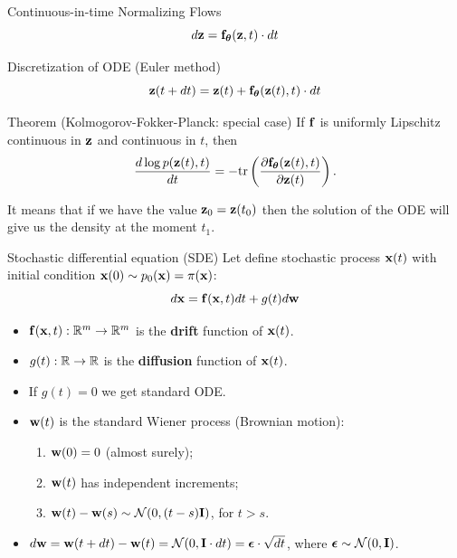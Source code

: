 \begin{frame}{Continuous-in-time Normalizing Flows}
	\[
 			d \mathbf{z} = \mathbf{f}_{\boldsymbol{\theta}}(\mathbf{z}, t) \cdot dt
	\]
	\vspace{-0.5cm}
	\begin{block}{Discretization of ODE (Euler method)}
		\vspace{-0.3cm}
		\[
			\mathbf{z}(t + dt) = \mathbf{z}(t) + \mathbf{f}_{\boldsymbol{\theta}}(\mathbf{z}(t), t) \cdot dt
		\]
		\vspace{-0.5cm}
	\end{block}
	\begin{block}{Theorem (Kolmogorov-Fokker-Planck: special case)}
		If $\mathbf{f}$ is uniformly Lipschitz continuous in $\mathbf{z}$ and continuous in $t$, then
		\[
			\frac{d \log p(\mathbf{z}(t), t)}{d t} = - \text{tr} \left( \frac{\partial \mathbf{f}_{\boldsymbol{\theta}}(\mathbf{z}(t), t)}{\partial \mathbf{z}(t)} \right).
		\]
	\end{block}
	It means that if we have the value $\mathbf{z}_0 = \mathbf{z}(t_0)$ then the solution of the ODE will give us the density at the moment $t_1$.
\end{frame}
\begin{frame}{Stochastic differential equation (SDE)}
	Let define stochastic process $\mathbf{x}(t)$ with initial condition $\mathbf{x}(0) \sim p_0(\mathbf{x}) = \pi(\mathbf{x})$:
	\[
		d\mathbf{x} = \mathbf{f}(\mathbf{x}, t) dt + g(t) d \mathbf{w}
	\]
	\vspace{-0.5cm}
	\begin{itemize}
		 \item $\mathbf{f}(\mathbf{x}, t): \mathbb{R}^m \rightarrow \mathbb{R}^m$ is the \textbf{drift} function of $\mathbf{x}(t)$.
		 \item $g(t): \mathbb{R} \rightarrow \mathbb{R}$ is the \textbf{diffusion} function of $\mathbf{x}(t)$.
		 \item If $g(t) = 0$ we get standard ODE.
		 \item $\mathbf{w}(t)$ is the standard Wiener process (Brownian motion):
		 \begin{enumerate}
		 	\item $\mathbf{w}(0) = 0$ (almost surely);
		 	\item $\mathbf{w}(t)$ has independent increments;
			 \item $\mathbf{w}(t) - \mathbf{w}(s) \sim \mathcal{N}(0, (t - s) \mathbf{I})$, for $t > s$.
		 \end{enumerate}
		 \item $d \mathbf{w} = \mathbf{w}(t + dt) - \mathbf{w}(t) = \mathcal{N}(0, \mathbf{I} \cdot dt ) = \boldsymbol{\epsilon} \cdot \sqrt{dt}$, where $\boldsymbol{\epsilon} \sim \mathcal{N}(0, \mathbf{I})$.
	\end{itemize}
\end{frame}

